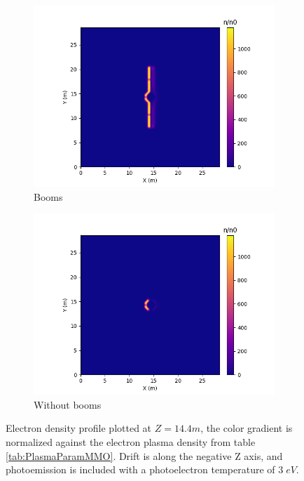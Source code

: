 \begin{figure}[H]
  \begin{subfigure}[b]{0.6\textwidth}
  \includegraphics[width=\textwidth]{figures/MMO/PHTemp/WB/E_PHTemp_WB.png}
  \caption{Booms}
  \label{fig:E_PHTemp_WB}
\end{subfigure}
\begin{subfigure}[b]{0.6\textwidth}
  \includegraphics[width=\textwidth]{figures/MMO/PHTemp/NB/E_PHTemp_NB.png}
  \caption{Without booms}
  \label{fig:E_PHTemp_NB}
\end{subfigure}
\label{fig:Elec_PHTemp}
\caption{Electron density profile plotted at $Z = 14.4 m$, the color gradient is normalized against the electron plasma density from table \ref{tab:PlasmaParamMMO}. Drift is along the negative Z axis, and photoemission is included with a photoelectron temperature of $3 \; eV$.}
\end{figure}